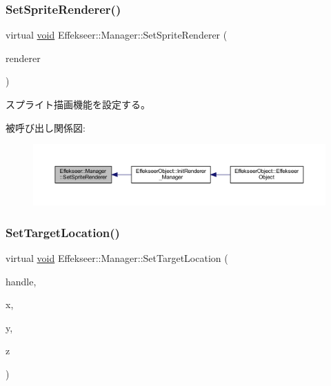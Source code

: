 \subsubsection{\texorpdfstring{Set\+Sprite\+Renderer()}{SetSpriteRenderer()}}
{\footnotesize\ttfamily virtual \mbox{\hyperlink{namespace_effekseer_ab34c4088e512200cf4c2716f168deb56}{void}} Effekseer\+::\+Manager\+::\+Set\+Sprite\+Renderer (\begin{DoxyParamCaption}\item[{\mbox{\hyperlink{class_effekseer_1_1_sprite_renderer}{Sprite\+Renderer}} $\ast$}]{renderer }\end{DoxyParamCaption})\hspace{0.3cm}{\ttfamily [pure virtual]}}



スプライト描画機能を設定する。 

被呼び出し関係図\+:\nopagebreak
\begin{figure}[H]
\begin{center}
\leavevmode
\includegraphics[width=350pt]{class_effekseer_1_1_manager_a1b4f22221e7068d6604c18aa4ca4b80e_icgraph}
\end{center}
\end{figure}
\mbox{\label{class_effekseer_1_1_manager_a3c709343770c431420772ab3ca6639e1}} 
\subsubsection{\texorpdfstring{Set\+Target\+Location()}{SetTargetLocation()}\hspace{0.1cm}{\footnotesize\ttfamily [1/2]}}
{\footnotesize\ttfamily virtual \mbox{\hyperlink{namespace_effekseer_ab34c4088e512200cf4c2716f168deb56}{void}} Effekseer\+::\+Manager\+::\+Set\+Target\+Location (\begin{DoxyParamCaption}\item[{\mbox{\hyperlink{namespace_effekseer_afba58b8d812da862190e9bbfc040824a}{Handle}}}]{handle,  }\item[{float}]{x,  }\item[{float}]{y,  }\item[{float}]{z }\end{DoxyParamCaption})\hspace{0.3cm}{\ttfamily [pure virtual]}}



